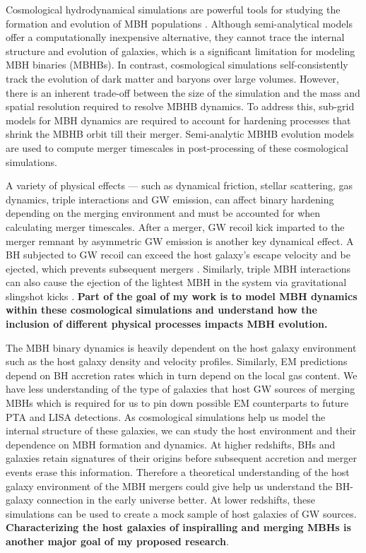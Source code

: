 \documentclass[11pt, letterpaper]{article}
\begin{document}
Cosmological hydrodynamical simulations are powerful tools for studying the formation and evolution of MBH populations \citep{HorizonAGN2014,2015Illustris,2015Eagle,nelson2021illustristngsimulationspublicdata}. Although semi-analytical models \citep{Sesana_2011,Barausse_2012, Klein_2016,Dayal_2019,bonetti_post-newtonian_2019, Valiante_2020} offer a computationally inexpensive alternative, they cannot trace the internal structure and evolution of galaxies, which is a significant limitation
for modeling MBH binaries (MBHBs). In contrast, cosmological simulations self-consistently track the evolution of dark matter and baryons over large volumes.  However, there is an inherent trade-off between the size of the simulation and the mass and spatial resolution required to resolve MBHB dynamics. To address this, sub-grid models for MBH dynamics are required to account for hardening processes that shrink the MBHB orbit till their merger. Semi-analytic MBHB evolution models are used to compute merger timescales in post-processing of these cosmological simulations. 


A variety of physical effects — such as dynamical friction, stellar scattering, gas dynamics, triple interactions and GW emission, can affect binary hardening depending on the merging environment and must be accounted for when calculating merger timescales. After a merger, GW recoil kick imparted to the merger remnant by asymmetric GW emission \citep{Bekenstein1973} is another key dynamical effect. A BH subjected to GW recoil can exceed the host galaxy’s escape velocity and be ejected, which prevents subsequent mergers \citep{volonteri_gravitational_2007,Gerosa_2014,Blecha2016,sayeb_massive_2021}. Similarly, triple MBH interactions can also cause the ejection of the lightest MBH in the system via gravitational slingshot kicks \citep{volonteri_assembly_2003}. \textbf{Part of the goal of my work is to model MBH dynamics within these cosmological simulations and understand how the inclusion of different physical processes impacts MBH evolution.}

The MBH binary dynamics is heavily dependent on the host galaxy environment such as the host galaxy density and velocity profiles. Similarly, EM predictions depend on BH accretion rates which in turn depend on the local gas content. We have less understanding of the type of galaxies that host GW sources of merging MBHs which is required for us to pin down possible EM counterparts to future PTA and LISA detections. As cosmological simulations help us model the internal structure of these galaxies, we can study the host environment and their dependence on MBH formation and dynamics. At higher redshifts, BHs and galaxies retain signatures of their origins before subsequent accretion and merger events erase this information. Therefore a theoretical understanding of the host galaxy environment of the MBH mergers could give help us understand the BH-galaxy connection in the early universe better. At lower redshifts, these simulations can be used to create a mock sample of host galaxies of GW sources. \textbf{Characterizing the host galaxies of inspiralling and merging MBHs is another major goal of my proposed research}.
\end{document}
